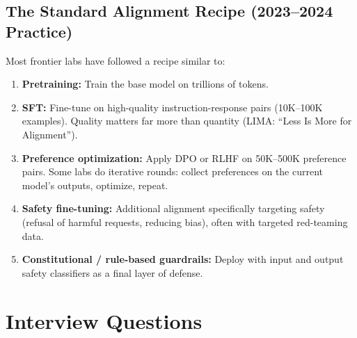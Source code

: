 \subsection{The Standard Alignment Recipe (2023--2024 Practice)}

Most frontier labs have followed a recipe similar to:

\begin{enumerate}[leftmargin=*]
\item \textbf{Pretraining:} Train the base model on trillions of tokens.
\item \textbf{SFT:} Fine-tune on high-quality instruction-response pairs
  (10K--100K examples). Quality matters far more than quantity (LIMA: ``Less
  Is More for Alignment'').
\item \textbf{Preference optimization:} Apply DPO or RLHF on 50K--500K
  preference pairs.  Some labs do iterative rounds: collect preferences
  on the current model's outputs, optimize, repeat.
\item \textbf{Safety fine-tuning:} Additional alignment specifically
  targeting safety (refusal of harmful requests, reducing bias), often
  with targeted red-teaming data.
\item \textbf{Constitutional / rule-based guardrails:} Deploy with input
  and output safety classifiers as a final layer of defense.
\end{enumerate}


\section{Interview Questions}
\label{sec:alignment_interview}

